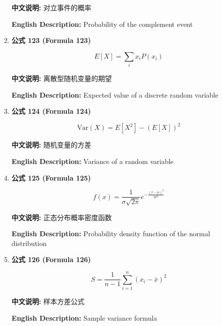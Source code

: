 \documentclass[12pt,a4paper]{article}
\begin{document}
\begin{enumerate}[leftmargin=*]
\textbf{中文说明:} 对立事件的概率

\textbf{English Description:} Probability of the complement event

\vspace{0.5cm}

\item \textbf{公式 123 (Formula 123)}

\begin{equation}
E[X] = \sum_{i} x_i P(x_i)
\end{equation}

\textbf{中文说明:} 离散型随机变量的期望

\textbf{English Description:} Expected value of a discrete random variable

\vspace{0.5cm}

\item \textbf{公式 124 (Formula 124)}

\begin{equation}
\text{Var}(X) = E[X^2] - (E[X])^2
\end{equation}

\textbf{中文说明:} 随机变量的方差

\textbf{English Description:} Variance of a random variable

\vspace{0.5cm}

\item \textbf{公式 125 (Formula 125)}

\begin{equation}
f(x) = \frac{1}{\sigma\sqrt{2\pi}} e^{-\frac{(x-\mu)^2}{2\sigma^2}}
\end{equation}

\textbf{中文说明:} 正态分布概率密度函数

\textbf{English Description:} Probability density function of the normal distribution

\vspace{0.5cm}

\item \textbf{公式 126 (Formula 126)}

\begin{equation}
S = \frac{1}{n-1} \sum_{i=1}^n (x_i - \bar{x})^2
\end{equation}

\textbf{中文说明:} 样本方差公式

\textbf{English Description:} Sample variance formula

\vspace{0.5cm}


\end{enumerate}
\end{document}
